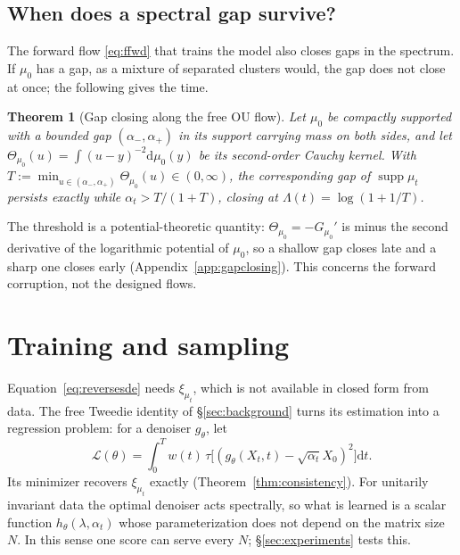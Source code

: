 \documentclass[11pt]{article}
\newcommand{\dd}{\mathrm{d}}
\DeclareMathOperator{\supp}{supp}
\theoremstyle{plain}
\newtheorem{theorem}{Theorem}[section]
\theoremstyle{definition}
\theoremstyle{remark}
\begin{document}
\subsection{When does a spectral gap survive?}\label{sec:gapclosing}

The forward flow \eqref{eq:ffwd} that trains the model also closes gaps in the spectrum. If
$\mu_0$ has a gap, as a mixture of separated clusters would, the gap does not close at once;
the following gives the time.

\begin{theorem}[Gap closing along the free OU flow]\label{thm:gapclosing}
Let $\mu_0$ be compactly supported with a bounded gap $(\alpha_-,\alpha_+)$ in its
support carrying mass on both sides, and let
$\Theta_{\mu_0}(u)=\int(u-y)^{-2}\dd\mu_0(y)$ be its second-order Cauchy kernel. With
$T:=\min_{u\in(\alpha_-,\alpha_+)}\Theta_{\mu_0}(u)\in(0,\infty)$, the corresponding
gap of $\supp\mu_t$ persists exactly while $\alpha_t > T/(1+T)$, closing at
$\Lambda(t)=\log(1+1/T)$.
\end{theorem}

The threshold is a potential-theoretic quantity: $\Theta_{\mu_0}=-G_{\mu_0}'$ is minus the
second derivative of the logarithmic potential of $\mu_0$, so a shallow gap closes late and a
sharp one closes early (Appendix~\ref{app:gapclosing}). This concerns the forward corruption,
not the designed flows.

\section{Training and sampling}\label{sec:algorithm}

Equation~\eqref{eq:reversesde} needs $\xi_{\mu_t}$, which is not available in closed form
from data. The free Tweedie identity of \S\ref{sec:background} turns its estimation into a
regression problem: for a denoiser $g_\theta$, let
\begin{equation}\label{eq:loss}
  \mathcal L(\theta)=\int_0^T\!\! w(t)\,\tau\big[(g_\theta(X_t,t)-\sqrt{\alpha_t}X_0)^2
  \big]\dd t.
\end{equation}
Its minimizer recovers $\xi_{\mu_t}$ exactly (Theorem~\ref{thm:consistency}). For
unitarily invariant data the optimal denoiser acts spectrally, so what is learned is a scalar
function $h_\theta(\lambda,\alpha_t)$ whose parameterization does not depend on the matrix size
$N$. In this sense one score can serve every $N$; \S\ref{sec:experiments} tests this.
\end{document}
